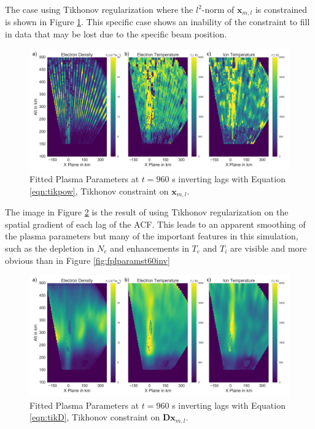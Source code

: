 The case using Tikhonov regularization where the $l^2$-norm of $\mathbf{x}_{m,l}$ is constrained is shown in Figure \ref{fig:tikpow}. This specific case shows an inability of the constraint to fill in data that may be lost due to the specific beam position. 

\begin{figure}[!ht]
\centering
\includegraphics[width=6in]{tikfitted}
\caption{Fitted Plasma Parameters at $t=960$ s inverting lags with Equation \ref{eqn:tikpow}, Tikhonov constraint on $\mathbf{x}_{m,l}$. }
\label{fig:tikpow}
\end{figure}

The image in Figure \ref{fig:tikD} is the result of using Tikhonov regularization on the spatial gradient of each lag of the ACF. This leads to an apparent smoothing of the plasma parameters but many of the important features in this simulation, such as the depletion in $N_e$ and enhancements in $T_e$ and $T_i$ are visible and more obvious than in Figure \ref{fig:fplparamst60inv}
\begin{figure}[!ht]
\centering
\includegraphics[width=6in]{tikdfitted}
\caption{Fitted Plasma Parameters at $t=960$ s inverting lags with Equation \ref{eqn:tikD}, Tikhonov constraint on $\mathbf{Dx}_{m,l}$. }
\label{fig:tikD}
\end{figure}

